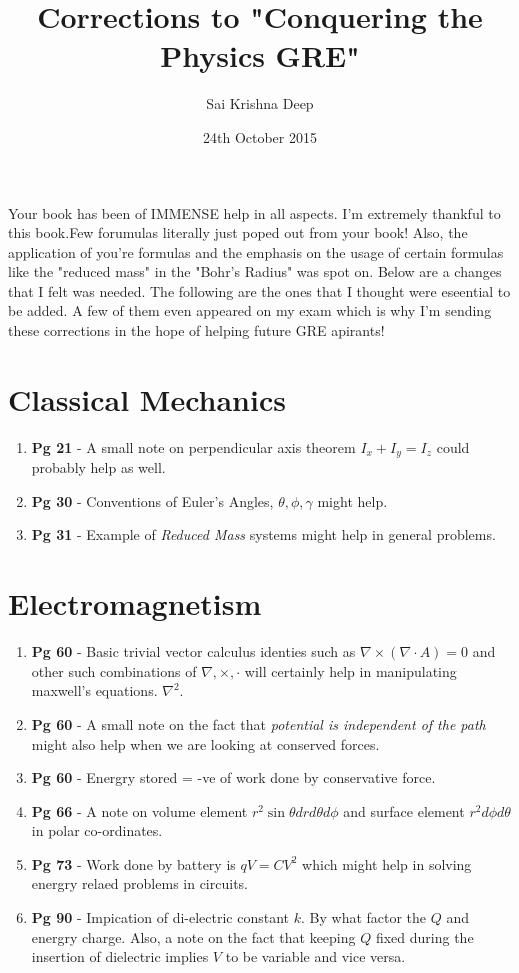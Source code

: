 \documentclass{article}
\title{Corrections to "Conquering the Physics GRE"}
\author{Sai Krishna Deep}
\date{24th October 2015}
\begin{document}
\maketitle

Your book has been of IMMENSE help in all aspects. I'm extremely thankful to this book.Few forumulas literally just poped out from your book! Also, the application of you're formulas and the emphasis on the usage of certain formulas like the "reduced mass" in the "Bohr's Radius" was spot on. Below are a changes that I felt was needed. The following are the ones that I thought were eseential to be added. A few of them even appeared on my exam which is why I'm sending these corrections in the hope of helping future GRE apirants! \\

\section{Classical Mechanics}
\begin{enumerate}
\item \textbf{Pg 21} - A small note on perpendicular axis theorem $I_x+I_y = I_z$ could probably help as well.
\item \textbf{Pg 30} - Conventions of Euler's Angles, $\theta,\phi,\gamma$ might help.
\item \textbf{Pg 31} - Example of \textit{Reduced Mass} systems might help in general problems.
\end{enumerate}
\section{Electromagnetism}
\begin{enumerate}
\item \textbf{Pg 60} - Basic trivial vector calculus identies such as $\nabla \times (\nabla\cdot A) =0$ and other such combinations of $\nabla,\times,\cdot$ will certainly help in manipulating maxwell's equations. $\nabla^2$.
\item \textbf{Pg 60} - A small note on the fact that \textit{potential is independent of the path} might also help when we are looking at conserved forces.
\item \textbf{Pg 60} - Energry stored = -ve of work done by conservative force.
\item \textbf{Pg 66} - A note on volume element $r^2\sin \theta dr d\theta d\phi$ and surface element $r^2 d\phi d\theta$ in polar co-ordinates.
\item \textbf{Pg 73} - Work done by battery is $qV = CV^2$ which might help in solving energry relaed problems in circuits.
\item \textbf{Pg 90} - Impication of di-electric constant $k$. By what factor the $Q$ and energry charge. Also, a note on the fact that keeping $Q$ fixed during the insertion of dielectric implies $V$ to be variable and vice versa.
\end{enumerate}
\end{document}
